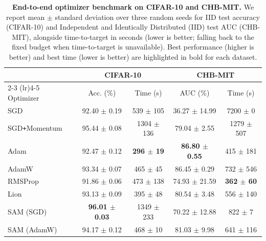 \begin{table}[htp!]
\centering
\begin{tabular}{lcccc}
\toprule
& \multicolumn{2}{c}{CIFAR-10} & \multicolumn{2}{c}{CHB-MIT} \\
\cmidrule(lr){2-3} \cmidrule(lr){4-5}
Optimizer & Acc. (\%) & Time (s) & AUC (\%) & Time (s) \\
\midrule
SGD & 92.40 $\pm$ 0.19 & 539 $\pm$ 105 & 36.27 $\pm$ 14.99 & 7200 $\pm$ 0 \\ 
SGD\texttt{+}Momentum & 95.44 $\pm$ 0.08 & 1304 $\pm$ 136 & 79.04 $\pm$ 2.55 & 1279 $\pm$ 507 \\ 
Adam & 92.47 $\pm$ 0.12 & \textbf{296 $\pm$ 19} & \textbf{86.80 $\pm$ 0.55} & 415 $\pm$ 181 \\ 
AdamW & 93.34 $\pm$ 0.07 & 465 $\pm$ 45 & 86.45 $\pm$ 0.29 & 732 $\pm$ 546 \\ 
RMSProp & 91.86 $\pm$ 0.06 & 473 $\pm$ 138 & 74.93 $\pm$ 21.59 & \textbf{362 $\pm$ 60} \\ 
Lion & 93.13 $\pm$ 0.09 & 395 $\pm$ 48 & 80.54 $\pm$ 3.48 & 556 $\pm$ 140 \\ 
SAM (SGD) & \textbf{96.01 $\pm$ 0.03} & 1349 $\pm$ 233 & 70.22 $\pm$ 12.88 & 822 $\pm$ 7 \\ 
SAM (AdamW) & 94.17 $\pm$ 0.12 & 468 $\pm$ 10 & 81.03 $\pm$ 9.98 & 641 $\pm$ 116 \\ 
\bottomrule
\end{tabular}
\caption{\textbf{End-to-end optimizer benchmark on CIFAR-10 and CHB-MIT.} We report mean $\pm$ standard deviation over three random seeds for IID test accuracy (CIFAR-10) and Independent and Identically Distributed (IID) test AUC (CHB-MIT), alongside time-to-target in seconds (lower is better; falling back to the fixed budget when time-to-target is unavailable). Best performance (higher is better) and best time (lower is better) are highlighted in bold for each dataset.}
\label{tab:results}
\end{table}
